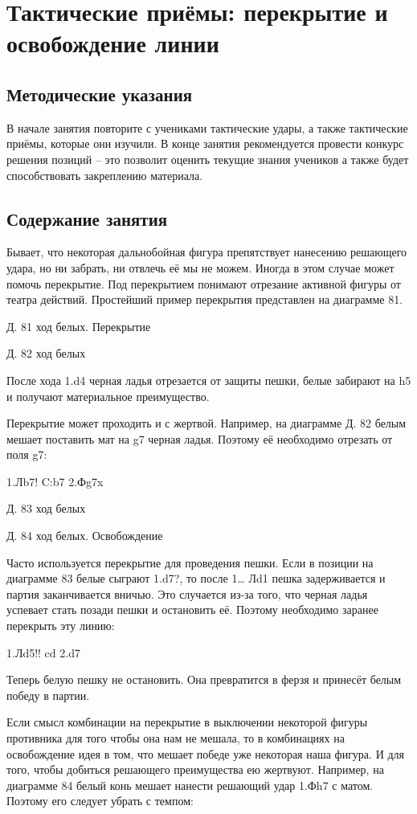 \chapter{Тактические приёмы: перекрытие и освобождение линии}

\section{Методические указания}

В начале занятия повторите с учениками тактические удары, а также тактические приёмы, которые они изучили. В конце занятия рекомендуется провести конкурс решения позиций – это позволит оценить текущие знания учеников а также будет способствовать закреплению материала.

\section{Содержание занятия}

Бывает, что некоторая дальнобойная фигура препятствует нанесению решающего удара, но ни забрать, ни отвлечь её мы не можем. Иногда в этом случае может помочь перекрытие. Под перекрытием понимают отрезание активной фигуры от театра действий. Простейший пример перекрытия представлен на диаграмме 81.
 
 
Д. 81 ход белых. Перекрытие
 
Д. 82 ход белых
 
После хода 1.d4 черная ладья отрезается от защиты пешки, белые забирают на h5 и получают материальное преимущество.

Перекрытие может проходить и с жертвой. Например, на диаграмме Д. 82 белым мешает поставить мат на g7 черная ладья. Поэтому её необходимо отрезать от поля g7:

1.Лb7! C:b7 2.Фg7x
 
 
Д. 83 ход белых
 
Д. 84 ход белых. Освобождение
 
Часто используется перекрытие для проведения пешки. Если в позиции на диаграмме 83 белые сыграют 1.d7?, то после 1… Лd1 пешка задерживается и партия заканчивается вничью. Это случается из-за того, что черная ладья успевает стать позади пешки и остановить её. Поэтому необходимо заранее перекрыть эту линию:

1.Лd5!! cd 2.d7

Теперь белую пешку не остановить. Она превратится в ферзя и принесёт белым победу в партии.

Если смысл комбинации на перекрытие в выключении некоторой фигуры противника для того чтобы она нам не мешала, то в комбинациях на освобождение идея в том, что мешает победе уже некоторая наша фигура. И для того, чтобы добиться решающего преимущества ею жертвуют. Например, на диаграмме 84 белый конь мешает нанести решающий удар 1.Фh7 с матом. Поэтому его следует убрать с темпом:

